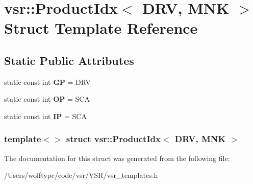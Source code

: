 \hypertarget{structvsr_1_1_product_idx_3_01_d_r_v_00_01_m_n_k_01_4}{\section{vsr\-:\-:Product\-Idx$<$ D\-R\-V, M\-N\-K $>$ Struct Template Reference}
\label{structvsr_1_1_product_idx_3_01_d_r_v_00_01_m_n_k_01_4}
}
\subsection*{Static Public Attributes}
\begin{DoxyCompactItemize}
\item 
\hypertarget{structvsr_1_1_product_idx_3_01_d_r_v_00_01_m_n_k_01_4_a4729d55c07179af294bb007dc5eab97b}{static const int {\bfseries G\-P} = D\-R\-V}\label{structvsr_1_1_product_idx_3_01_d_r_v_00_01_m_n_k_01_4_a4729d55c07179af294bb007dc5eab97b}

\item 
\hypertarget{structvsr_1_1_product_idx_3_01_d_r_v_00_01_m_n_k_01_4_abb9d2e08283d9ba335e67f84a5ec03e1}{static const int {\bfseries O\-P} = S\-C\-A}\label{structvsr_1_1_product_idx_3_01_d_r_v_00_01_m_n_k_01_4_abb9d2e08283d9ba335e67f84a5ec03e1}

\item 
\hypertarget{structvsr_1_1_product_idx_3_01_d_r_v_00_01_m_n_k_01_4_aa80b19f420ca9d02f18a51304a35cc5f}{static const int {\bfseries I\-P} = S\-C\-A}\label{structvsr_1_1_product_idx_3_01_d_r_v_00_01_m_n_k_01_4_aa80b19f420ca9d02f18a51304a35cc5f}

\end{DoxyCompactItemize}
\subsubsection*{template$<$$>$ struct vsr\-::\-Product\-Idx$<$ D\-R\-V, M\-N\-K $>$}



The documentation for this struct was generated from the following file\-:\begin{DoxyCompactItemize}
\item 
/\-Users/wolftype/code/vsr/\-V\-S\-R/vsr\-\_\-templates.\-h\end{DoxyCompactItemize}
